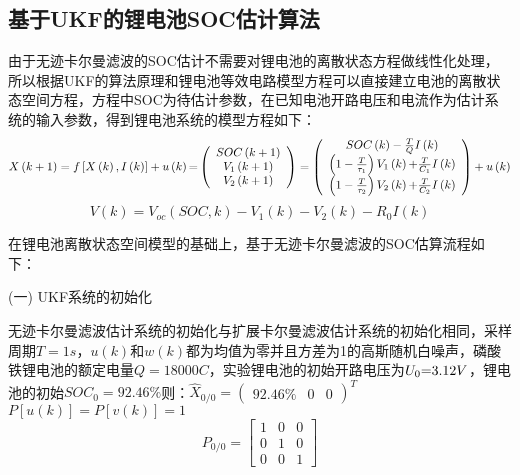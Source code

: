 \subsection{基于UKF的锂电池SOC估计算法}
由于无迹卡尔曼滤波的SOC估计不需要对锂电池的离散状态方程做线性化处理，所以根据UKF的算法原理和锂电池等效电路模型方程可以直接建立电池的离散状态空间方程，方程中SOC为待估计参数，在已知电池开路电压和电流作为估计系统的输入参数，得到锂电池系统的模型方程如下：
\begin{equation}
X\left( {k + 1} \right) = f\left[ {X\left( k \right),I\left( k \right)} \right] + u\left( k \right){\rm{ = }}\left( {\begin{array}{*{20}{c}}
{SOC\left( {k + 1} \right)}\\
{{V_1}\left( {k + 1} \right)}\\
{{V_2}\left( {k + 1} \right)}
\end{array}} \right) = \left( {\begin{array}{*{20}{c}}
{SOC\left( k \right) - \frac{T}{Q}I\left( k \right)}\\
{\left( {1 - \frac{T}{{{\tau _1}}}} \right){V_1}\left( k \right){\rm{ + }}\frac{T}{{{C_1}}}I\left( k \right)}\\
{\left( {1 - \frac{T}{{{\tau _2}}}} \right){V_2}\left( k \right){\rm{ + }}\frac{T}{{{C_2}}}I\left( k \right)}
\end{array}} \right) + u\left( k \right)
\end{equation}
\begin{equation}
V\left( k \right) = {V_{oc}}\left( {SOC,k} \right) - {V_1}\left( k \right) - {V_2}\left( k \right) - {R_0}I\left( k \right)
\end{equation}

在锂电池离散状态空间模型的基础上，基于无迹卡尔曼滤波的SOC估算流程如下：

(一)	UKF系统的初始化

	无迹卡尔曼滤波估计系统的初始化与扩展卡尔曼滤波估计系统的初始化相同，采样周期$T = 1s$，$u\left( k \right)$和$w\left( k \right)$都为均值为零并且方差为1的高斯随机白噪声，磷酸铁锂电池的额定电量$Q = 18000C$，实验锂电池的初始开路电压为${U_0}{\rm{ = }}3.12V$，锂电池的初始$SO{C_0} = 92.46\% $则：${\widehat X_{0/0}} = {\left( {\begin{array}{*{20}{c}}
{92.46\% }&0&0
\end{array}} \right)^T}$~$P\left[ {u\left( k \right)} \right] = P\left[ {v\left( k \right)} \right] = 1$
\[{P_{0/0}} = \left[ {\begin{array}{*{20}{c}}
1&0&0\\
0&1&0\\
0&0&1
\end{array}} \right]\]

